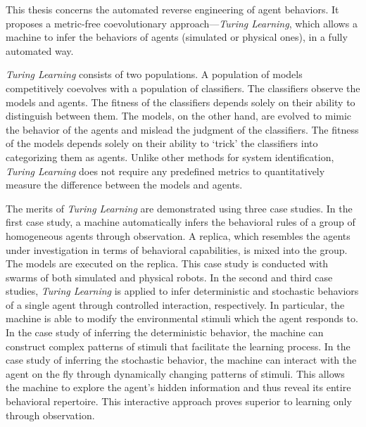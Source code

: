 This thesis concerns the automated reverse engineering of agent behaviors. It proposes a metric-free coevolutionary approach---\textit{Turing Learning}, which allows a machine to infer the behaviors of agents (simulated or physical ones), in a fully automated way. 

\textit{Turing Learning} consists of two populations. A population of models competitively coevolves with a population of classifiers. The classifiers observe the models and agents. The fitness of the classifiers depends solely on their ability to distinguish between them. The models, on the other hand, are evolved to mimic the behavior of the agents and mislead the judgment of the classifiers. The fitness of the models depends solely on their ability to `trick' the classifiers into categorizing them as agents. Unlike other methods for system identification, \textit{Turing Learning} does not require any predefined metrics to quantitatively measure the difference between the models and agents.

The merits of \textit{Turing Learning} are demonstrated using three case studies. In the first case study, a machine automatically infers the behavioral rules of a group of homogeneous agents through observation. A replica, which resembles the agents under investigation in terms of behavioral capabilities, is mixed into the group. The models are executed on the replica. This case study is conducted with swarms of both simulated and physical robots. In the second and third case studies, \textit{Turing Learning} is applied to infer deterministic and stochastic behaviors of a single agent through controlled interaction, respectively. In particular, the machine is able to modify the environmental stimuli which the agent responds to. In the case study of inferring the deterministic behavior, the machine can construct complex patterns of stimuli that facilitate the learning process. In the case study of inferring the stochastic behavior, the machine can interact with the agent on the fly through dynamically changing patterns of stimuli. This allows the machine to explore the agent's hidden information and thus reveal its entire behavioral repertoire. This interactive approach proves superior to learning only through observation. 


